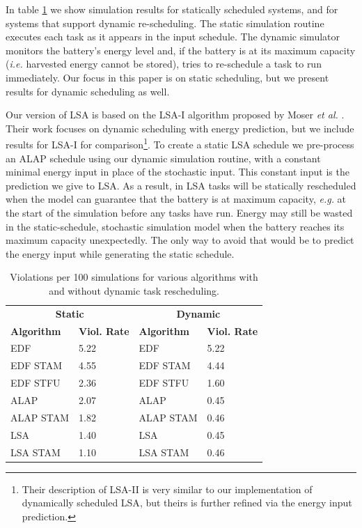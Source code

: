 In table \ref{tab:simresults} we show simulation results for statically scheduled systems, and for systems that support dynamic re-scheduling.  The static simulation routine executes each task as it appears in the input schedule.  The dynamic simulator monitors the battery's energy level and, if the battery is at its maximum capacity (\emph{i.e.} harvested energy cannot be stored), tries to re-schedule a task to run immediately.  Our focus in this paper is on static scheduling, but we present results for dynamic scheduling as well.

Our version of \textsc{LSA} is based on the \textsc{LSA-I} algorithm proposed by Moser \emph{et al.} \cite{moser2007real}.  Their work focuses on dynamic scheduling with energy prediction, but we include results for \textsc{LSA-I} for comparison\footnote{Their description of \textsc{LSA-II} is very similar to our implementation of dynamically scheduled \textsc{LSA}, but theirs is further refined via the energy input prediction.}.  To create a static \textsc{LSA} schedule we pre-process an \textsc{ALAP} schedule using our dynamic simulation routine, with a constant minimal energy input in place of the stochastic input.  This constant input is the prediction we give to \textsc{LSA}.  As a result, in \textsc{LSA} tasks will be statically rescheduled when the model can guarantee that the battery is at maximum capacity, \emph{e.g.} at the start of the simulation before any tasks have run.  Energy may still be wasted in the static-schedule, stochastic simulation model when the battery reaches its maximum capacity unexpectedly.  The only way to avoid that would be to predict the energy input while generating the static schedule.
\begin{table}[h]
\begin{center}
\begin{tabular}{| l l | l l |}
\hline
\multicolumn{2}{|c|}{\textbf{Static}} & \multicolumn{2}{|c|}{\textbf{Dynamic}} \\
\textbf{Algorithm} & \textbf{Viol. Rate} & \textbf{Algorithm} & \textbf{Viol. Rate} \\
\hline
EDF & 5.22 & EDF & 5.22 \\
EDF \textsc{STAM} & 4.55 & EDF \textsc{STAM} & 4.44 \\
EDF \textsc{STFU} & 2.36 & EDF \textsc{STFU} & 1.60 \\
ALAP & 2.07 & ALAP & 0.45 \\
ALAP \textsc{STAM} & 1.82 & ALAP \textsc{STAM} & 0.46 \\
LSA & 1.40 & LSA & 0.45 \\
LSA \textsc{STAM} & 1.10 & LSA \textsc{STAM} & 0.46 \\
\hline
\end{tabular}
\end{center}
\label{tab:simresults}
\caption{Violations per 100 simulations for various algorithms with and without dynamic task rescheduling.}
\end{table}
